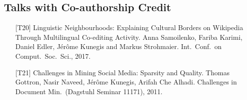 \documentclass[line,margin]{res}
\newcounter{x}
\begin{document}
\begin{resume}
\section{Talks with Co-authorship Credit}
\begin{itemize}
  \item[{[T20]}] Linguistic Neighbourhoods: Explaining Cultural Borders on
    Wikipedia Through Multilingual Co-editing Activity.  Anna
    Samoilenko, Fariba Karimi, Daniel Edler, Jérôme Kunegis and Markus
    Strohmaier. 
    Int.\ Conf.\ on Comput.\ Soc.\ Sci., 2017. 
  \item[{[T21]}] Challenges in Mining Social Media: Sparsity and Quality.
    Thomas Gottron, Nasir Naveed, Jérôme Kunegis, Arifah Che Alhadi.
    Challenges in Document Min.\ (Dagstuhl Seminar 11171), 2011. 
\end{itemize}


\end{resume}
\end{document}
